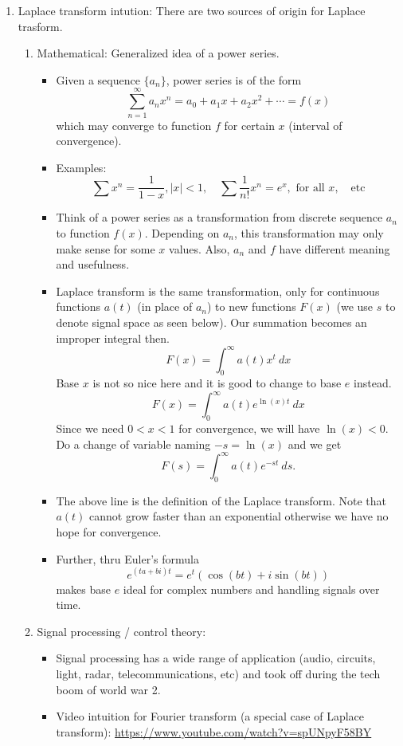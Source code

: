 \documentclass{article}
\begin{document}
\begin{enumerate}
\item Laplace transform intution: There are two sources of origin for Laplace trasform.
\begin{enumerate}
\item Mathematical: Generalized idea of a power series.
\begin{itemize}
\item Given a sequence $\{ a_n \}$, power series is of the form
\[
\sum_{n=1}^{\infty} a_n x^n = a_0 + a_1 x + a_2x^2 + \cdots = f(x)
\]
which may converge to function $f$ for certain $x$ (interval of convergence). 
\item Examples:
\[
\sum x^n = \frac{1}{1-x}, |x|<1, \quad \sum \frac{1}{n!} x^n = e^x, \text{ for all } x, \quad \text{etc}
\]
\item Think of a power series as a transformation from discrete sequence $a_n$ to function $f(x)$. Depending on $a_n$, this transformation may only make sense for some $x$ values. Also, $a_n$ and $f$ have different meaning and usefulness.
\item Laplace transform is the same transformation, only for continuous functions $a(t)$ (in place of $a_n$) to new functions $F(x)$ (we use $s$ to denote signal space as seen below). Our summation becomes an improper integral then.
\[
F(x) = \int_{0}^{\infty} a(t) x^{t} ~dx
\]
Base $x$ is not so nice here and it is good to change to base $e$ instead.
\[
F(x) = \int_{0}^{\infty} a(t) e^{\ln(x)t} ~dx
\]
Since we need $0<x<1$ for convergence, we will have $\ln(x)<0$. Do a change of variable naming $-s = \ln(x)$ and we get
\[
F(s) = \int_{0}^{\infty} a(t) e^{-st} ~ds.
\]
\item The above line is the definition of the Laplace transform. Note that $a(t)$ cannot grow faster than an exponential otherwise we have no hope for convergence. 
\item Further, thru Euler's formula
\[
e^{(ta+bi)t} = e^t(\cos(bt) + i\sin(bt))
\]
makes base $e$ ideal for complex numbers and handling signals over time.
\end{itemize}
\item Signal processing / control theory: 
\begin{itemize}
\item Signal processing has a wide range of application (audio, circuits, light, radar, telecommunications, etc) and took off during the tech boom of world war 2. 
\item Video intuition for Fourier transform (a special case of Laplace transform): \url{https://www.youtube.com/watch?v=spUNpyF58BY}
\end{itemize}
\end{enumerate}


\end{enumerate}
\end{document}
